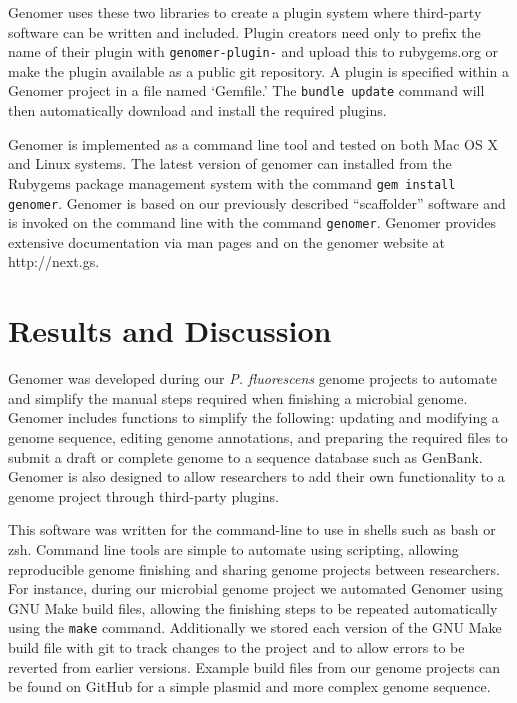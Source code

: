 \documentclass[10pt]{article}
\begin{document}
Genomer uses these two libraries to create a plugin system where third-party
software can be written and included. Plugin creators need only to prefix the
name of their plugin with \verb+genomer-plugin-+ and upload this to
rubygems.org or make the plugin available as a public git repository. A plugin
is specified within a Genomer project in a file named `Gemfile.' The
\verb+bundle update+ command will then automatically download and install the
required plugins.

Genomer is implemented as a command line tool and tested on both Mac OS X and
Linux systems. The latest version of genomer can installed from the Rubygems
package management system with the command \verb+gem install genomer+. Genomer
is based on our previously described ``scaffolder'' software and is invoked on
the command line with the command \verb+genomer+. Genomer provides extensive
documentation via man pages and on the genomer website at http://next.gs.

\section*{Results and Discussion}

Genomer was developed during our \emph{P. fluorescens} genome projects to
automate and simplify the manual steps required when finishing a microbial
genome. Genomer includes functions to simplify the following: updating and
modifying a genome sequence, editing genome annotations, and preparing the
required files to submit a draft or complete genome to a sequence database such
as GenBank. Genomer is also designed to allow researchers to add their own
functionality to a genome project through third-party plugins.

This software was written for the command-line to use in shells such as bash or
zsh. Command line tools are simple to automate using scripting, allowing
reproducible genome finishing and sharing genome projects between researchers.
For instance, during our microbial genome project we automated Genomer using
GNU Make build files, allowing the finishing steps to be repeated automatically
using the \verb+make+ command. Additionally we stored each version of the GNU
Make build file with git \cite{git-scm} to track changes to the project and to
allow errors to be reverted from earlier versions. Example build files from our
genome projects can be found on GitHub for a simple plasmid
\cite{plasmid-github} and more complex genome \cite{genome-github} sequence.
\end{document}

